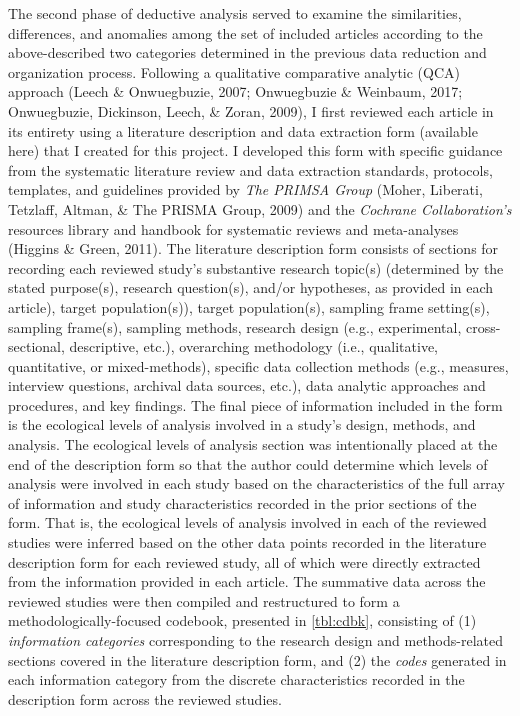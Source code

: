 \documentclass[11pt,]{tufte-book}
\begin{document}
The second phase of deductive analysis served to examine the
similarities, differences, and anomalies among the set of included
articles according to the above-described two categories determined in
the previous data reduction and organization process. Following a
qualitative comparative analytic (QCA) approach (Leech \& Onwuegbuzie,
2007; Onwuegbuzie \& Weinbaum, 2017; Onwuegbuzie, Dickinson, Leech, \&
Zoran, 2009), I first reviewed each article in its entirety using a
literature description and data extraction form (available here) that I
created for this project. I developed this form with specific guidance
from the systematic literature review and data extraction standards,
protocols, templates, and guidelines provided by \emph{The PRIMSA Group}
(Moher, Liberati, Tetzlaff, Altman, \& The PRISMA Group, 2009) and the
\emph{Cochrane Collaboration's} resources library and handbook for
systematic reviews and meta-analyses (Higgins \& Green, 2011). The
literature description form consists of sections for recording each
reviewed study's substantive research topic(s) (determined by the stated
purpose(s), research question(s), and/or hypotheses, as provided in each
article), target population(s)), target population(s), sampling frame
setting(s), sampling frame(s), sampling methods, research design (e.g.,
experimental, cross-sectional, descriptive, etc.), overarching
methodology (i.e., qualitative, quantitative, or mixed-methods),
specific data collection methods (e.g., measures, interview questions,
archival data sources, etc.), data analytic approaches and procedures,
and key findings. The final piece of information included in the form is
the ecological levels of analysis involved in a study's design, methods,
and analysis. The ecological levels of analysis section was
intentionally placed at the end of the description form so that the
author could determine which levels of analysis were involved in each
study based on the characteristics of the full array of information and
study characteristics recorded in the prior sections of the form. That
is, the ecological levels of analysis involved in each of the reviewed
studies were inferred based on the other data points recorded in the
literature description form for each reviewed study, all of which were
directly extracted from the information provided in each article. The
summative data across the reviewed studies were then compiled and
restructured to form a methodologically-focused codebook, presented in
\cref{tbl:cdbk}, consisting of (1) \emph{information
categories} corresponding to the research design and methods-related
sections covered in the literature description form, and (2) the
\emph{codes} generated in each information category from the discrete
characteristics recorded in the description form across the reviewed
studies.
\end{document}
